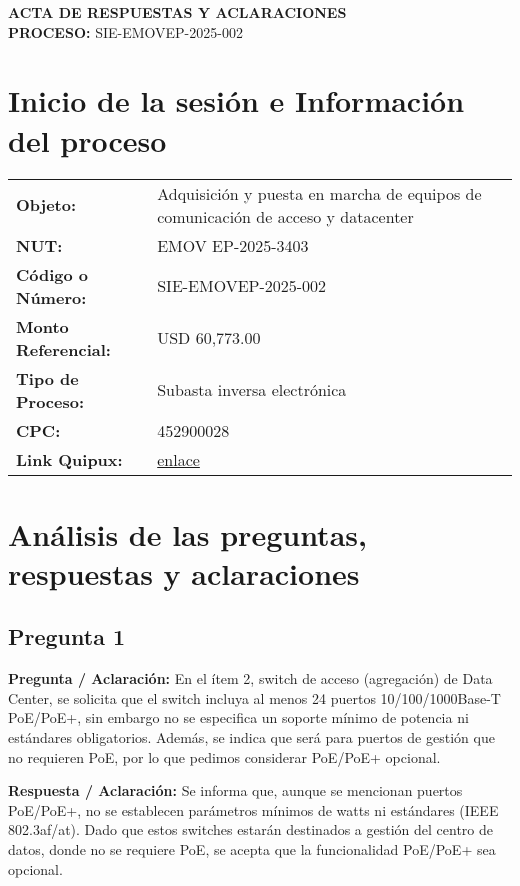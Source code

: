 \documentclass[12pt,a4paper]{article}
\begin{document}
\begin{center}
  {\LARGE\bfseries ACTA DE RESPUESTAS Y ACLARACIONES}\\[1ex]
  {\large \textbf{PROCESO:} SIE-EMOVEP-2025-002}\\[1ex]
\end{center}

\section*{Inicio de la sesión e Información del proceso}
\begin{tabular}{p{4cm}p{10cm}}
  \textbf{Objeto:}            & Adquisición y puesta en marcha de equipos de comunicación de acceso y datacenter \\
  \textbf{NUT:}               & EMOV EP-2025-3403 \\
  \textbf{Código o Número:}   & SIE-EMOVEP-2025-002 \\
  \textbf{Monto Referencial:}  & USD 60,773.00 \\
  \textbf{Tipo de Proceso:}    & Subasta inversa electrónica \\
  \textbf{CPC:}                & 452900028 \\
  \textbf{Link Quipux:}       & \url{enlace} \\
\end{tabular}

\section*{Análisis de las preguntas, respuestas y aclaraciones}

\subsection*{Pregunta 1}
\textbf{Pregunta / Aclaración:}
En el ítem 2, switch de acceso (agregación) de Data Center, se solicita que el switch incluya al menos 24 puertos 10/100/1000Base-T PoE/PoE+, sin embargo no se especifica un soporte mínimo de potencia ni estándares obligatorios. Además, se indica que será para puertos de gestión que no requieren PoE, por lo que pedimos considerar PoE/PoE+ opcional.

\textbf{Respuesta / Aclaración:}
Se informa que, aunque se mencionan puertos PoE/PoE+, no se establecen parámetros mínimos de watts ni estándares (IEEE 802.3af/at). Dado que estos switches estarán destinados a gestión del centro de datos, donde no se requiere PoE, se acepta que la funcionalidad PoE/PoE+ sea opcional.
\end{document}
